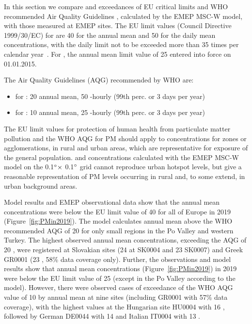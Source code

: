 In this section we compare \PM[10] and \PM[2.5] exceedances
of EU critical limits and WHO recommended Air Quality
Guidelines \citep{WHO:AQG}, calculated by the EMEP MSC-W model, with
those measured at EMEP sites. The EU limit values (Council 
Directive 1999/30/EC) for \PM[10] are 40 \ug for the annual mean and 50 \ug for
the daily mean concentrations, with the daily limit not to be exceeded
more than 35 times per calendar year~\citep{EU2008}. For \PM[2.5], the
annual mean limit value of 25 \ug entered into force on 01.01.2015.

The Air Quality Guidelines (AQG) recommended by WHO \citep{WHO:AQG}
are:
\begin{itemize}
\item for \PM[10]: 20 \ug annual mean, 50 -hourly (99th perc. or 3 days per year)
\item for \PM[2.5]: 10 \ug annual mean, 25 -hourly (99th perc. or 3 days per year)
\end{itemize}


The EU limit values for protection of human health from particulate
matter pollution and the WHO AQG for PM should apply to concentrations
for zones or agglomerations, in rural and urban areas,
which are representative for exposure of the general
population. \PM[10] and \PM[2.5] concentrations calculated with the
EMEP MSC-W model on the 0.1$^\circ \times$ 0.1$^\circ$ grid cannot
reproduce urban hotspot levels, but give a reasonable representation
of PM levels occurring in rural and, to some extend, in urban background
areas.


Model results and EMEP observational data show that the annual mean \PM[10] concentrations were below the EU limit value of 40 \ug for all of Europe in 2019 (Figure~\ref{fig:PMin2019}). The model calculates annual mean \PM[10] above the WHO recommended AQG of 20 \ug
for only small regions in the Po Valley and western Turkey. The highest
observed annual mean \PM[10] concentrations, exceeding the AQG of 20 \ug, were registered at Slovakian sites (24 \ug at SK0004 and 23 \ug SK0007) and Greek GR0001 (23 \ug, 58\% data coverage only). Further, the observations and model results show that annual mean \PM[2.5] concentrations (Figure~\ref{fig:PMin2019}) in 2019 were below the EU limit value of 25 \ug (except in the Po Valley according to the model). However, there were observed cases of exceedance of the WHO AQG value of 10 \ug by annual mean \PM[2.5] at nine sites (including GR0001 with 57\% data coverage), with the highest values at the Hungarian site HU0004 with 16 \ug, followed by German DE0044 with 14 \ug and Italian IT0004 with 13 \ug.


